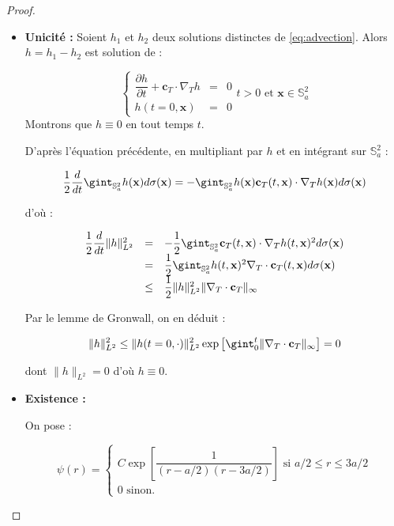 \begin{proof}
\begin{itemize}
\item \textbf{Unicité :} Soient $h_1$ et $h_2$ deux solutions distinctes de \eqref{eq:advection}. Alors $h=h_1-h_2$ est solution de :

$$
\left\lbrace
\begin{array}{rcl}
\dfrac{\partial h}{\partial t} + \mathbf{c}_T \cdot \nabla_T h & = & 0 \\
h(t=0,\mathbf{x}) & = & 0
\end{array}
\right. t>0 \text{ et } \mathbf{x} \in \mathbb{S}_a^2
$$
Montrons que $h \equiv 0$ en tout temps $t$.

D'après l'équation précédente, en multipliant par $h$ et en intégrant sur $\mathbb{S}_a^2$ :

$$\dfrac{1}{2} \dfrac{d}{dt} \gint_{\mathbb{S}_a^2} h(\mathbf{x}) d \sigma(\mathbf{x}) = - \gint_{\mathbb{S}_a^2} h(\mathbf{x}) \mathbf{c}_T(t,\mathbf{x}) \cdot \nabla_T h(\mathbf{x}) d \sigma (\mathbf{x})$$

d'où :

$$
\begin{array}{rcl}
\dfrac{1}{2} \dfrac{d}{dt} \| h \|^2_{L^2} & = & - \dfrac{1}{2} \gint_{\mathbb{S}_a^2} \mathbf{c}_T(t,\mathbf{x}) \cdot \nabla_T h(t,\mathbf{x})^2 d \sigma(\mathbf{x})\\
& = & \dfrac{1}{2} \gint_{\mathbb{S}_a^2} h(t,\mathbf{x})^2 \nabla_T \cdot \mathbf{c}_T (t, \mathbf{x}) d \sigma(\mathbf{x}) \\
& \leq & \dfrac{1}{2} \| h \|^2_{L^2} \| \nabla_T \cdot \mathbf{c}_T \|_{\infty}
\end{array}
$$

Par le lemme de Gronwall, on en déduit :

$$
\|h\|^2_{L^2} \leq \|h(t=0,\cdot) \|^2_{L^2} \exp \left[ \gint_0^t \| \nabla_T \cdot \mathbf{c}_T \|_{\infty}  \right] = 0
$$

dont $\|h\|_{L^2} = 0$ d'où $h \equiv 0$.

\item \textbf{Existence :}

On pose :

\begin{equation}
\psi(r) = 
\left\lbrace
\begin{array}{rcl}
C \exp \left[ \dfrac{1}{(r-a/2)(r-3a/2)} \right] \text{ si } a/2 \leq r \leq 3a/2 \\
0 \text{ sinon. }
\end{array}
\right.
\end{equation}


\end{itemize}
\end{proof}
